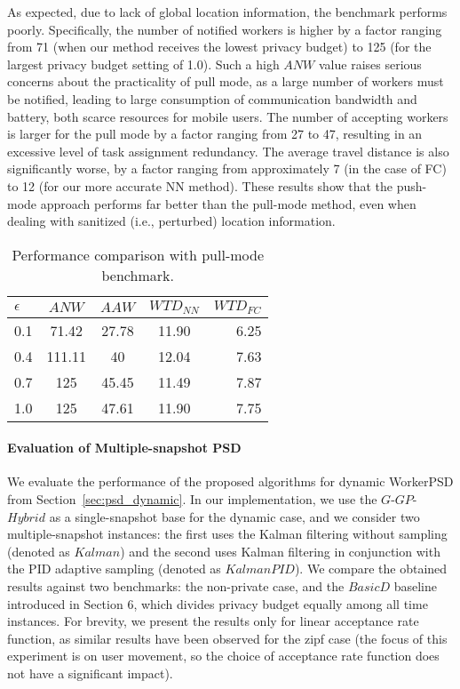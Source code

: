 \documentclass{USC-Thesis}
\newcommand{\tn}{\tabularnewline}
\numberwithin{equation}{chapter}
\begin{document}
As expected, due to lack of global location information, the benchmark performs poorly. Specifically, the number of notified workers is higher by a factor ranging from 71 (when our method receives the lowest privacy budget) to 125 (for the largest privacy budget setting of 1.0). Such a high $\mathit{ANW}$ value raises serious concerns about the practicality of pull mode, as a large number of workers must be notified, leading to large consumption of communication bandwidth and battery, both scarce resources for mobile users. The number of accepting workers is larger for the pull mode by a factor ranging from 27 to 47, resulting in an excessive level of task assignment redundancy. The average travel distance is also significantly worse, by a factor ranging from approximately 7 (in the case of FC) to 12 (for our more accurate NN method). These results show that the push-mode approach performs far better than the pull-mode method, even when dealing with sanitized (i.e., perturbed) location information.

\begin{table}[ht]
\begin{center}
\footnotesize
\begin{tabular}{ l | c | c | c | r}
\textbf{$\epsilon$} & \textbf{$\mathit{ANW}$} & \textbf{$\mathit{AAW}$} & \textbf{$\mathit{WTD_{NN}}$} & \textbf{$\mathit{WTD_{FC}}$} \tn
\hline
0.1 & 71.42 & 27.78 & 11.90 & 6.25 \tn
\hline
0.4 & 111.11 & 40 & 12.04 & 7.63 \tn
\hline
0.7 & 125 & 45.45 & 11.49 & 7.87 \tn
\hline
1.0 & 125 & 47.61 & 11.90 & 7.75 \tn
\end{tabular}
\caption{Performance comparison with pull-mode benchmark.}
\label{tab:privacy_wst}
\end{center}
\end{table}


\paragraph{Evaluation of Multiple-snapshot PSD}
\label{sec:results2}

We evaluate the performance of the proposed algorithms for dynamic WorkerPSD from Section~\ref{sec:psd_dynamic}. In our implementation, we use the $G$-$\mathit{GP}$-$\mathit{Hybrid}$ as a single-snapshot base for the dynamic case, and we consider two multiple-snapshot instances: the first uses the Kalman filtering without sampling (denoted as $\mathit{Kalman}$) and the second uses Kalman filtering in conjunction with the PID adaptive sampling (denoted as $\mathit{KalmanPID}$).
We compare the obtained results against two benchmarks: the non-private case, and the $\mathit{BasicD}$ baseline introduced in Section 6, which divides privacy budget equally among all time instances. For brevity, we present the results only for linear acceptance rate function, as similar results have been observed for the zipf case (the focus of this experiment is on user movement, so the choice of acceptance rate function does not have a significant impact).
\end{document}
